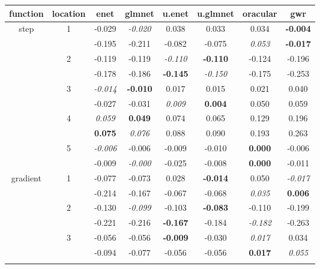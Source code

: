 \documentclass[authoryear, review, 11pt]{elsarticle}
\begin{document}
		\begin{table}
		\thispagestyle{empty}
		\begin{center}
		\begin{tabular}{cccccccc}
 function & location & enet & glmnet & u.enet & u.glmnet & oracular & gwr \\ 
  \hline
  \multirow{10}{*}{step} & \multirow{2}{*}{1} & -0.029 & \emph{-0.020} & 0.038 & 0.033 & 0.034 & \textbf{-0.004} \\ 
   &  & -0.195 & -0.211 & -0.082 & -0.075 & \emph{0.053} & \textbf{-0.017} \\ 
   \cline{3-8}
   & \multirow{2}{*}{2} & -0.119 & -0.119 & \emph{-0.110} & \textbf{-0.110} & -0.124 & -0.196 \\ 
   &  & -0.178 & -0.186 & \textbf{-0.145} & \emph{-0.150} & -0.175 & -0.253 \\ 
   \cline{3-8}
   & \multirow{2}{*}{3} & \emph{-0.014} & \textbf{-0.010} & 0.017 & 0.015 & 0.021 & 0.040 \\ 
   &  & -0.027 & -0.031 & \emph{0.009} & \textbf{0.004} & 0.050 & 0.059 \\ 
   \cline{3-8}
   & \multirow{2}{*}{4} & \emph{0.059} & \textbf{0.049} & 0.074 & 0.065 & 0.129 & 0.196 \\ 
   &  & \textbf{0.075} & \emph{0.076} & 0.088 & 0.090 & 0.193 & 0.263 \\ 
   \cline{3-8}
   & \multirow{2}{*}{5} & \emph{-0.006} & -0.006 & -0.009 & -0.010 & \textbf{0.000} & -0.006 \\ 
   &  & -0.009 & \emph{-0.000} & -0.025 & -0.008 & \textbf{0.000} & -0.011 \\ 
   \hline
   \multirow{10}{*}{gradient} & \multirow{2}{*}{1} & -0.077 & -0.073 & 0.028 & \textbf{-0.014} & 0.050 & \emph{-0.017} \\ 
   &  & -0.214 & -0.167 & -0.067 & -0.068 & \emph{0.035} & \textbf{0.006} \\ 
   \cline{3-8}
   & \multirow{2}{*}{2} & -0.130 & \emph{-0.099} & -0.103 & \textbf{-0.083} & -0.110 & -0.199 \\ 
   &  & -0.221 & -0.216 & \textbf{-0.167} & -0.184 & \emph{-0.182} & -0.263 \\ 
   \cline{3-8}
   & \multirow{2}{*}{3} & -0.056 & -0.056 & \textbf{-0.009} & -0.030 & \emph{0.017} & 0.034 \\ 
   &  & -0.094 & -0.077 & -0.056 & -0.056 & \textbf{0.017} & \emph{0.055} \\ 
   \cline{3-8}

\end{tabular}
\end{center}
\end{table}
\end{document}
